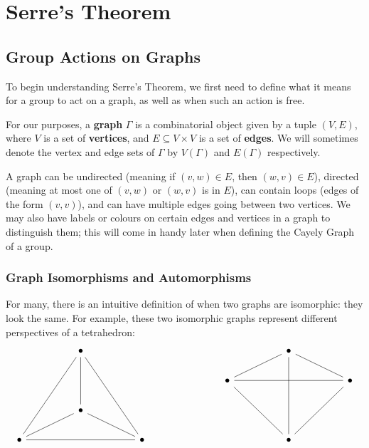 \section{Serre's Theorem}

\subsection{Group Actions on Graphs}

To begin understanding Serre's Theorem, we first need to define what it means for a group to act on a graph, as well as when such an action is free. 

For our purposes, a \textbf{graph} $\Gamma$ is a combinatorial object given by a tuple $(V,E)$, where $V$ is a set of \textbf{vertices}, and $E \subseteq V \times V$ is a set of \textbf{edges}. We will sometimes denote the vertex and edge sets of $\Gamma$ by $V(\Gamma)$ and $E(\Gamma)$ respectively. 

A graph can be undirected (meaning if $(v,w) \in E$, then $(w,v) \in E$), directed (meaning at most one of $(v,w)$ or $(w,v)$ is in $E$), can contain loops (edges of the form $(v,v)$), and can have multiple edges going between two vertices. We may also have labels or colours on certain edges and vertices in a graph to distinguish them; this will come in handy later when defining the Cayely Graph of a group. 

\subsubsection{Graph Isomorphisms and Automorphisms}

For many, there is an intuitive definition of when two graphs are isomorphic: they look the same. For example, these two isomorphic graphs represent different perspectives of a tetrahedron:
\[\begin{tikzcd}
	&& \bullet &&&&&&& \bullet \\
	&&&&&&& \bullet &&&& \bullet \\
	&& \bullet \\
	\bullet &&&& \bullet &&&&& \bullet
	\arrow[no head, from=1-3, to=3-3]
	\arrow[no head, from=1-3, to=4-1]
	\arrow[no head, from=1-10, to=2-8]
	\arrow[no head, from=1-10, to=2-12]
	\arrow[no head, from=2-8, to=2-12]
	\arrow[no head, from=2-12, to=4-10]
	\arrow[no head, from=3-3, to=4-5]
	\arrow[no head, from=4-1, to=3-3]
	\arrow[no head, from=4-1, to=4-5]
	\arrow[no head, from=4-5, to=1-3]
	\arrow[no head, from=4-10, to=1-10]
	\arrow[no head, from=4-10, to=2-8]
\end{tikzcd}\]

